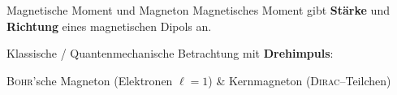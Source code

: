 \documentclass[t,9pt]{beamer}
\newcommand{\td}{\text{d}}
\begin{document}
        \begin{frame}{Magnetische Moment und Magneton}
                Magnetisches Moment gibt \textbf{Stärke} und \textbf{Richtung} eines magnetischen Dipols an.
                \begin{center}
                        \tcboxmath[colframe=white]{\boldsymbol{m}=\dfrac{1}{2}\int_{}^{}\td ^3r\left[\boldsymbol{r}\times \boldsymbol{j}\left(\boldsymbol{r}\right)\right]\qquad \boldsymbol{m}=I\cdot\boldsymbol{A}}
                \end{center}
                \pause
                Klassische / Quantenmechanische Betrachtung mit \textbf{Drehimpuls}:
                \begin{center}
                \end{center}
                \pause
                \textsc{Bohr}'sche Magneton (Elektronen $\ell=1$) \& Kernmagneton (\textsc{Dirac}--Teilchen)
                \begin{center}
                \end{center}
        \end{frame}

\end{document}
